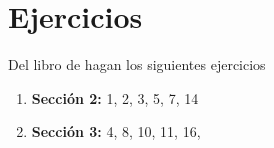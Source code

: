 \documentclass[
  12pt,
]{book}
\providecommand{\tightlist}{%
  \setlength{\itemsep}{0pt}\setlength{\parskip}{0pt}}
\theoremstyle{definition}
\theoremstyle{definition}
\theoremstyle{definition}
\theoremstyle{definition}
\theoremstyle{remark}
\begin{document}
\hypertarget{ejercicios}{%
\section{Ejercicios}\label{ejercicios}}

Del libro de \autocite{HardleNonparametric2004} hagan los siguientes ejercicios

\begin{enumerate}
\def\labelenumi{\arabic{enumi}.}
\tightlist
\item
  \textbf{Sección 2:} 1, 2, 3, 5, 7, 14
\item
  \textbf{Sección 3:} 4, 8, 10, 11, 16,
\end{enumerate}

\printbibliography
\end{document}
